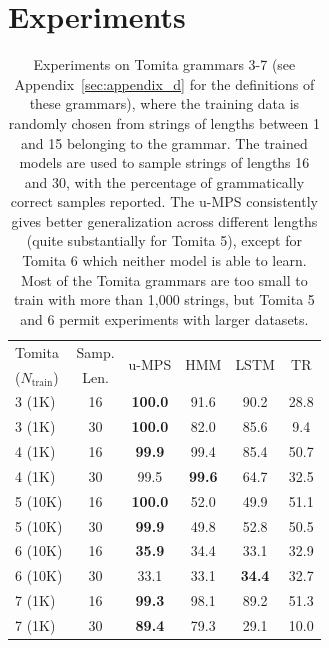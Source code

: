 \section{Experiments}
\label{sec:experiments}
%
\begin{table}[t]
\caption{Experiments on Tomita grammars 3-7 (see Appendix~\ref{sec:appendix_d} for the definitions of these grammars), where the training data is randomly chosen from strings of lengths between 1 and 15 belonging to the grammar. The trained models are used to sample strings of lengths 16 and 30, with the percentage of grammatically correct samples reported. The u-MPS consistently gives better generalization across different lengths (quite substantially for Tomita 5), except for Tomita 6 which neither model is able to learn. Most of the Tomita grammars are too small to train with more than 1,000 strings, but Tomita 5 and 6 permit experiments with larger datasets.}
\label{tab:tomita}
\setlength\aboverulesep{0.1pt}
\setlength\belowrulesep{0.1pt}
\renewcommand{\arraystretch}{1.1}
\begin{center}
\begin{small}
\begin{sc}
\begin{tabular}{lc|cccc}
    Tomita & Samp. & \multirow{2}{*}{u-MPS} & \multirow{2}{*}{HMM} & \multirow{2}{*}{LSTM} & \multirow{2}{*}{TR} \\
    ($N_{\mathrm{train}}$) & Len. &  &  &  \\
    \midrule
    3 (1K)  & 16 & \textbf{100.0} & 91.6          & 90.2          & 28.8 \\
    3 (1K)  & 30 & \textbf{100.0} & 82.0          & 85.6          & 9.4  \\
    4 (1K)  & 16 & \textbf{99.9}  & 99.4          & 85.4          & 50.7 \\
    4 (1K)  & 30 & 99.5           & \textbf{99.6} & 64.7          & 32.5 \\
    5 (10K) & 16 & \textbf{100.0} & 52.0          & 49.9          & 51.1 \\
    5 (10K) & 30 & \textbf{99.9}  & 49.8          & 52.8          & 50.5 \\
    6 (10K) & 16 & \textbf{35.9}  & 34.4          & 33.1          & 32.9 \\
    6 (10K) & 30 & 33.1           & 33.1          & \textbf{34.4} & 32.7 \\
    7 (1K)  & 16 & \textbf{99.3}  & 98.1          & 89.2          & 51.3 \\
    7 (1K)  & 30 & \textbf{89.4}  & 79.3          & 29.1          & 10.0 \\
    

\end{tabular}
\end{sc}
\end{small}
\end{center}
\end{table}
